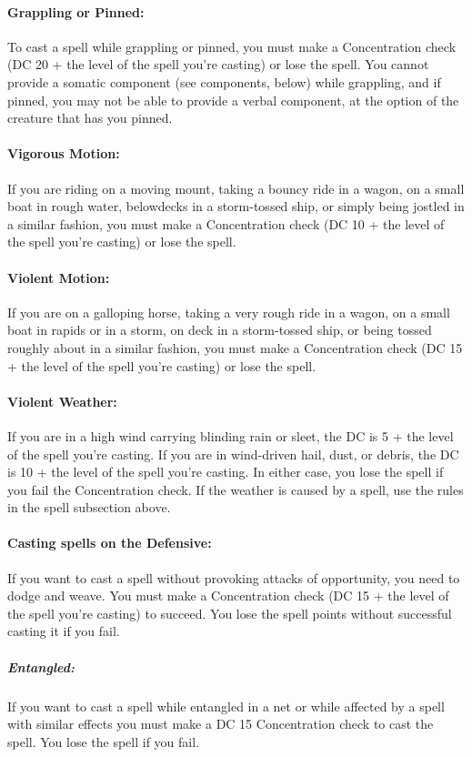 \paragraph{Grappling or Pinned:} To cast a spell while grappling or pinned, 
you must make a Concentration check (DC 20 + the level of the spell you're casting) or lose the spell. 
You cannot provide a somatic component (see components, below) while grappling, 
and if pinned, you may not be able to provide a verbal component, at the option of the creature that has you pinned.

\paragraph{Vigorous Motion:} If you are riding on a moving mount, taking a bouncy ride in a wagon, 
on a small boat in rough water, belowdecks in a storm-tossed ship, 
or simply being jostled in a similar fashion, you must make a Concentration check (DC 10 + the level of the spell you're casting) or lose the spell.

\paragraph{Violent Motion:} If you are on a galloping horse, taking a very rough ride in a wagon, 
on a small boat in rapids or in a storm, on deck in a storm-tossed ship, or being tossed roughly about in a similar fashion, 
you must make a Concentration check (DC 15 + the level of the spell you're casting) or lose the spell.

\paragraph{Violent Weather:} If you are in a high wind carrying blinding rain or sleet, 
the DC is 5 + the level of the spell you're casting. If you are in wind-driven hail, dust, 
or debris, the DC is 10 + the level of the spell you're casting. 
In either case, you lose the spell if you fail the Concentration check. 
If the weather is caused by a spell, use the rules in the spell subsection above.

\paragraph{Casting spells on the Defensive:} If you want to cast a spell without provoking attacks of opportunity, you need to dodge and weave. You must make a Concentration check (DC 15 + the level of the spell you're casting) to succeed. You lose the spell points without successful casting it if you fail.
\subparagraph{Entangled:} If you want to cast a spell while entangled in a net or while affected by a spell with similar effects you must make a DC 15 Concentration check to cast the spell. You lose the spell if you fail.

